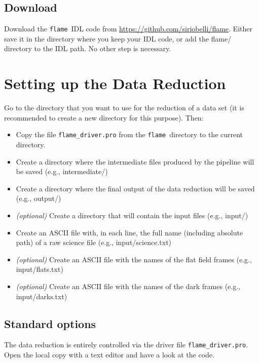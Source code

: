 \documentclass[a4paper, notitlepage]{article}
\newcommand{\flame}{\texttt{flame}}
\begin{document}
\subsection{Download}

Download the \flame\ IDL code from \url{https://github.com/siriobelli/flame}. Either save it in the directory where you keep your IDL code, or add the flame/ directory to the IDL path. No other step is necessary.




\section{Setting up the Data Reduction}

Go to the directory that you want to use for the reduction of a data set (it is recommended to create a new directory for this purpose). Then:
\begin{itemize}
\item Copy the file \texttt{flame\_driver.pro} from the \flame\ directory to the current directory.
\item Create a directory where the intermediate files produced by the pipeline will be saved (e.g., intermediate/)
\item Create a directory where the final output of the data reduction will be saved (e.g., output/)
\item \emph{(optional)} Create a directory that will contain the input files (e.g., input/)
\item Create an ASCII file with, in each line, the full name (including absolute path) of a raw science file (e.g., input/science.txt)
\item \emph{(optional)} Create an ASCII file with the names of the flat field frames (e.g., input/flats.txt)
\item \emph{(optional)} Create an ASCII file with the names of the dark frames (e.g., input/darks.txt)
\end{itemize}


\subsection{Standard options}

The data reduction is entirely controlled via the driver file \texttt{flame\_driver.pro}. Open the local copy with a text editor and have a look at the code.
\end{document}
